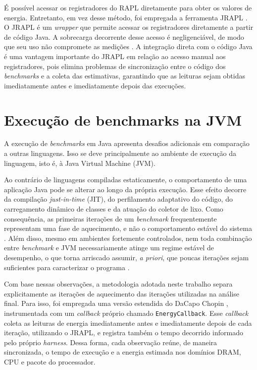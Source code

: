 É possível acessar os registradores do RAPL diretamente para obter os valores
de energia. Entretanto, em vez desse método, foi empregada a ferramenta JRAPL
\cite{jrapl}. O JRAPL é um \textit{wrapper} que permite acessar os
registradores diretamente a partir de código Java. A sobrecarga decorrente
desse acesso é negligenciável, de modo que seu uso não compromete as medições
\cite{programming_lang_energy}. A integração direta com o código Java é uma
vantagem importante do JRAPL em relação ao acesso manual aos registradores, pois
elimina problemas de sincronização entre o código dos \textit{benchmarks} e a
coleta das estimativas, garantindo que as leituras sejam obtidas imediatamente
antes e imediatamente depois das execuções.

\section{Execução de benchmarks na JVM}

A execução de \textit{benchmarks} em Java apresenta desafios adicionais em
comparação a outras linguagens. Isso se deve principalmente ao ambiente de
execução da linguagem, isto é, à Java Virtual Machine (JVM).

Ao contrário de linguagens compiladas estaticamente, o comportamento de uma
aplicação Java pode se alterar ao longo da própria execução. Esse efeito
decorre da compilação \textit{just-in-time} (JIT), do perfilamento adaptativo
do código, do carregamento dinâmico de classes e da atuação do coletor de lixo.
Como consequência, as primeiras iterações de um \textit{benchmark}
frequentemente representam uma fase de aquecimento, e não o comportamento
estável do sistema \cite{vms-hot-and-cold, steady-state-assessment}. Além
disso, mesmo em ambientes fortemente controlados, nem toda combinação entre
\textit{benchmark} e JVM necessariamente atinge um regime estável de
desempenho, o que torna arriscado assumir, \textit{a priori}, que poucas
iterações sejam suficientes para caracterizar o programa
\cite{vms-hot-and-cold}.

Com base nessas observações, a metodologia adotada neste trabalho separa
explicitamente as iterações de aquecimento das iterações utilizadas na análise
final. Para isso, foi empregada uma versão estendida do DaCapo Chopin
\cite{dacapochopin}, instrumentada com um \textit{callback} próprio chamado
\texttt{EnergyCallback}. Esse \textit{callback} coleta as leituras de energia
imediatamente antes e imediatamente depois de cada iteração, utilizando o
JRAPL, e registra também o tempo decorrido informado pelo próprio
\textit{harness}. Dessa forma, cada observação reúne, de maneira sincronizada,
o tempo de execução e a energia estimada nos domínios DRAM, CPU e pacote do
processador.

